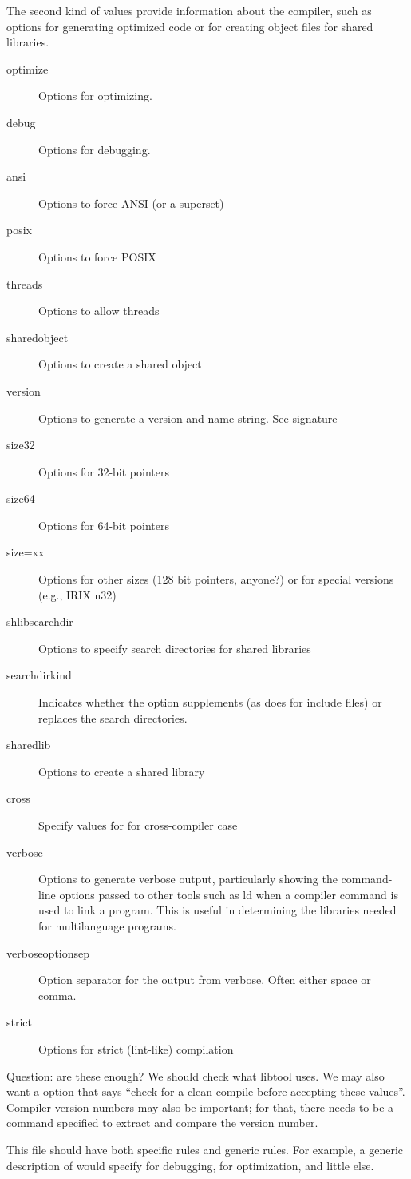 \documentclass{article}
\begin{document}
The second kind of values provide information about the compiler, such as
options for generating optimized code or for creating object files for shared libraries.
\begin{description}
\item[optimize]Options for optimizing.
\item[debug]Options for debugging.
\item[ansi]Options to force ANSI (or a superset)
\item[posix]Options to force POSIX
\item[threads]Options to allow threads
\item[sharedobject]Options to create a shared object
\item[version]Options to generate a version and name string.  See signature
\item[size32]Options for 32-bit pointers
\item[size64]Options for 64-bit pointers
\item[size=xx]Options for other sizes (128 bit pointers, anyone?) or
for special versions (e.g., IRIX n32)
\item[shlibsearchdir]Options to specify search directories for shared
libraries
\item[searchdirkind]Indicates whether the  option
supplements (as  does for include files) or replaces the
search directories.  
\item[sharedlib]Options to create a shared library
\item[cross]Specify values for  for cross-compiler case
\item[verbose]Options to generate verbose output, particularly showing
the command-line options passed to other tools such as ld when a
compiler command is used to link a program.  This is useful in
determining the libraries needed for multilanguage programs.
\item[verboseoptionsep]Option separator for the output from verbose.
Often either space or comma.
\item[strict]Options for strict (lint-like) compilation
\end{description}
Question: are these enough?  We should check what libtool uses.
We may also want a option that says ``check for a clean compile before
accepting these values''.  Compiler version numbers may also be
important; for that, there needs to be a command specified to extract and
compare the version number.

This file should have both specific rules and generic rules.  For
example, a generic description of  would specify 
for debugging,  for optimization, and little else.  
\end{document}
